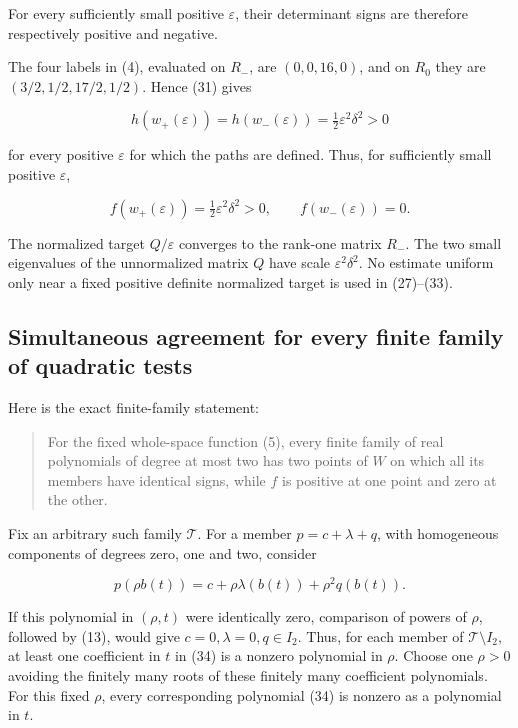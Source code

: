 \documentclass[11pt]{article}
\begin{document}
For every sufficiently small positive \(\varepsilon\), their determinant
signs are therefore respectively positive and negative.

The four labels in (4), evaluated on \(R_-\), are \((0,0,16,0)\), and on
\(R_0\) they are \((3/2,1/2,17/2,1/2)\). Hence (31) gives

\[
h(w_+(\varepsilon))=h(w_-(\varepsilon))
  =\tfrac12\varepsilon^2\delta^2>0
\]

for every positive \(\varepsilon\) for which the paths are defined. Thus,
for sufficiently small positive \(\varepsilon\),

\[
f(w_+(\varepsilon))=\tfrac12\varepsilon^2\delta^2>0,
\qquad f(w_-(\varepsilon))=0.
\tag{33}
\]

The normalized target \(Q/\varepsilon\) converges to the rank-one matrix
\(R_-\). The two small eigenvalues of the unnormalized matrix \(Q\) have scale
\(\varepsilon^2\delta^2\). No estimate uniform only near a fixed positive
definite normalized target is used in (27)--(33).

\subsection{Simultaneous agreement for every finite family of quadratic tests}

Here is the exact finite-family statement:

\begin{quote}
For the fixed whole-space function (5), every finite family of real
polynomials of degree at most two has two points of \(W\) on which all its
members have identical signs, while \(f\) is positive at one point and
zero at the other.
\end{quote}

Fix an arbitrary such family \(\mathcal T\). For a member
\(p=c+\lambda+q\), with homogeneous components of degrees zero, one and two,
consider

\[
p(\rho b(t))=c+\rho\lambda(b(t))+\rho^2q(b(t)).
\tag{34}
\]

If this polynomial in \((\rho,t)\) were identically zero, comparison of
powers of \(\rho\), followed by (13), would give
\(c=0,\lambda=0,q\in I_2\). Thus, for each member of
\(\mathcal T\setminus I_2\), at least one coefficient in \(t\) in (34)
is a nonzero polynomial in \(\rho\). Choose one \(\rho>0\) avoiding the
finitely many roots of these finitely many coefficient polynomials. For
this fixed \(\rho\), every corresponding polynomial (34) is nonzero as a
polynomial in \(t\).
\end{document}

